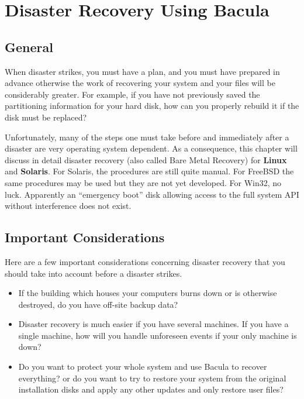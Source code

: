 
\section*{Disaster Recovery Using Bacula}
\label{_ChapterStart38}

\subsection*{General}

When disaster strikes, you must have a plan, and you must have prepared in
advance otherwise the work of recovering your system and your files will be
considerably greater. For example, if you have not previously saved the
partitioning information for your hard disk, how can you properly rebuild it
if the disk must be replaced? 

Unfortunately, many of the steps one must take before and immediately after a
disaster are very operating system dependent. As a consequence, this chapter
will discuss in detail disaster recovery (also called Bare Metal Recovery) for
{\bf Linux} and {\bf Solaris}. For Solaris, the procedures are still quite
manual. For FreeBSD the same procedures may be used but they are not yet
developed. For Win32, no luck. Apparently an ``emergency boot'' disk allowing
access to the full system API without interference does not exist. 
\label{considerations1}

\subsection*{Important Considerations}

Here are a few important considerations concerning disaster recovery that you
should take into account before a disaster strikes. 

\begin{itemize}
\item If the building which houses your computers burns down or is otherwise 
   destroyed, do you have off-site backup data? 
\item Disaster recovery is much easier if you have several machines. If  you
   have a single machine, how will you handle unforeseen events  if your only
   machine is down? 
\item Do you want to protect your whole system and use Bacula to  recover
   everything? or do you want to try to restore your system from  the original
   installation disks and apply any other updates and  only restore user files? 
\end{itemize}

